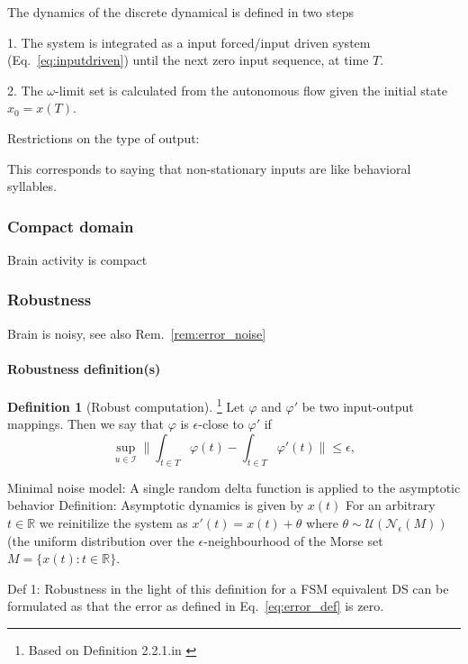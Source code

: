 \documentclass{scrartcl}
\theoremstyle{definition}
\newtheorem{definition}{Definition}
\theoremstyle{remark}
\newcommand{\reals}{\mathbb{R}}
\begin{document}
The dynamics of the discrete dynamical is defined in two steps

1. The system is integrated as a input forced/input driven system (Eq.~\ref{eq:inputdriven}) until the next zero input sequence, at time $T$.

2. The $\omega$-limit set is calculated from the autonomous flow given the initial state $x_0=x(T)$.



Restrictions on the type of output: 

This corresponds to saying that non-stationary inputs are like behavioral syllables.


\subsubsection{Compact domain}
Brain activity is compact

\subsubsection{Robustness}
Brain is noisy, see also Rem.~\ref{rem:error_noise}

\paragraph{Robustness definition(s)}

\begin{definition}[Robust computation]\footnote{Based on Definition 2.2.1.in \citep{kuehn2015}}
 Let $\varphi$ and $\varphi'$ be two input-output mappings.
  Then we say that $\varphi$ is $\epsilon$-close to $\varphi'$ if
\begin{equation}\label{eq:error_def}
\sup_{u\in \mathcal{I}}\|\int_{t\in T}\varphi(t) - \int_{t\in T}\varphi'(t)\|  \leq \epsilon,
\end{equation}
\end{definition}


Minimal noise model: 
A single random delta function is applied to the asymptotic behavior
Definition:
Asymptotic dynamics is given by $x(t)$
For an arbitrary $t \in \reals$ we reinitilize the system as $x'(t)=x(t) + \theta$ where $\theta\sim \mathcal{U}(\mathcal{N}_\epsilon(M))$ (the uniform distribution over the $\epsilon$-neighbourhood of the Morse set $M=\{x(t)\colon t\in \reals\}$.

Def 1: Robustness in the light of this definition for a FSM equivalent DS can be formulated as that the error as defined in Eq.~\ref{eq:error_def} is zero.
\end{document}
